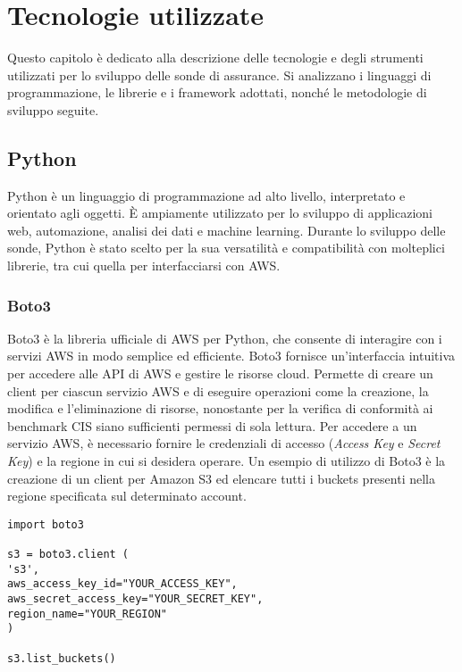 \chapter{Tecnologie utilizzate}
\label{cap:tecnologie}

Questo capitolo è dedicato alla descrizione delle tecnologie e degli strumenti utilizzati per lo sviluppo delle sonde di assurance. Si analizzano i linguaggi di programmazione, le librerie e i framework adottati, nonché le metodologie di sviluppo seguite.

\section{Python}
\label{sec:python}

Python è un linguaggio di programmazione ad alto livello, interpretato e orientato agli oggetti. È ampiamente utilizzato per lo sviluppo di applicazioni web, automazione, analisi dei dati e machine learning. Durante lo sviluppo delle sonde, Python è stato scelto per la sua versatilità e compatibilità con molteplici librerie, tra cui quella per interfacciarsi con AWS.

\subsection{Boto3}
\label{sec:boto3}

Boto3 è la libreria ufficiale di AWS per Python, che consente di interagire con i servizi AWS in modo semplice ed efficiente. Boto3 fornisce un'interfaccia intuitiva per accedere alle API di AWS e gestire le risorse cloud. Permette di creare un client per ciascun servizio AWS e di eseguire operazioni come la creazione, la modifica e l'eliminazione di risorse, nonostante per la verifica di conformità ai benchmark CIS siano sufficienti permessi di sola lettura. Per accedere a un servizio AWS, è necessario fornire le credenziali di accesso (\textit{Access Key} e \textit{Secret Key}) e la regione in cui si desidera operare. Un esempio di utilizzo di Boto3 è la creazione di un client per Amazon S3 ed elencare tutti i buckets presenti nella regione specificata sul determinato account.

\begin{lstlisting}[style=mypython, caption={Esempio di utilizzo di Boto3 per elencare i bucket S3}]
import boto3

s3 = boto3.client (
's3',
aws_access_key_id="YOUR_ACCESS_KEY",
aws_secret_access_key="YOUR_SECRET_KEY",
region_name="YOUR_REGION"
)

s3.list_buckets()
\end{lstlisting}

